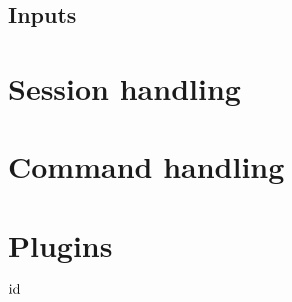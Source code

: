\subsection{Inputs}

\newpage
\section{Session handling}

\newpage
\section{Command handling}

\newpage
\section{Plugins}

\vfill
$ \version\ $
\eject


